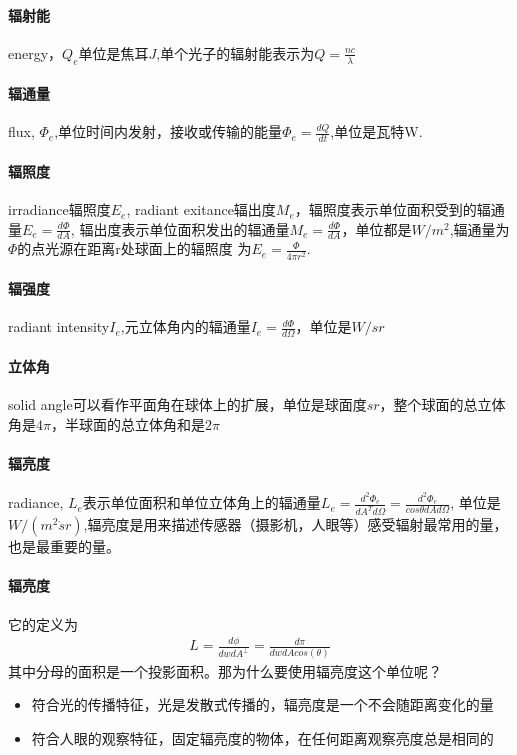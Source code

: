 \paragraph{辐射能}
energy，$Q_{e}$单位是焦耳$J$,单个光子的辐射能表示为$Q=\frac{nc}{\lambda}$

\paragraph{辐通量}
flux, $\Phi_{e}$,单位时间内发射，接收或传输的能量$\Phi_{e}=\frac{dQ}{dt}$,单位是瓦特W.

\paragraph{辐照度}
irradiance辐照度$E_{e}$, radiant exitance辐出度$M_{e}$，辐照度表示单位面积受到的辐通量$E_{e}=\frac{d\Phi}{dA}$, 
辐出度表示单位面积发出的辐通量$M_{e}=\frac{d\Phi}{dA}$，单位都是$W/m^{2}$,辐通量为$\Phi$的点光源在距离r处球面上的辐照度
为$E_{e}=\frac{\Phi}{4 \pi r^{2}}$.

\paragraph{辐强度}
radiant intensity$I_{e}$,元立体角内的辐通量$I_{e}=\frac{d\Phi}{d\Omega}$，单位是$W/sr$

\paragraph{立体角}
solid angle可以看作平面角在球体上的扩展，单位是球面度$sr$，整个球面的总立体角是$4\pi$，半球面的总立体角和是$2\pi$

\paragraph{辐亮度}
radiance, $L_{e}$表示单位面积和单位立体角上的辐通量$L_{e}=\frac{d^{2}\Phi_{e}}{dA^{T}d\Omega}=\frac{d^{2}\Phi_{e}}{cos\theta dA d\Omega}$,
单位是$W/(m^{2}\dot sr)$,辐亮度是用来描述传感器（摄影机，人眼等）感受辐射最常用的量，也是最重要的量。

\paragraph{辐亮度}
它的定义为
\begin{align*}
    L = \frac{d\phi}{dwdA^{\perp}} = \frac{d\pi}{dwdAcos(\theta)}
\end{align*}
其中分母的面积是一个投影面积。那为什么要使用辐亮度这个单位呢？
\begin{itemize}
    \item {符合光的传播特征，光是发散式传播的，辐亮度是一个不会随距离变化的量}
    \item {符合人眼的观察特征，固定辐亮度的物体，在任何距离观察亮度总是相同的}
\end{itemize}

